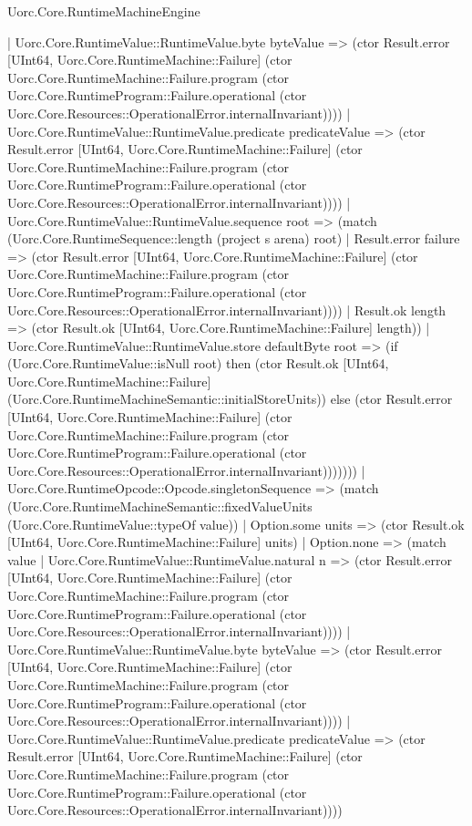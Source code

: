 \begin{lexlean}{Uorc.Core.RuntimeMachineEngine}
\begin{semanticmodule}
{              | Uorc.Core.RuntimeValue::RuntimeValue.byte byteValue => (ctor Result.error [UInt64, Uorc.Core.RuntimeMachine::Failure] (ctor Uorc.Core.RuntimeMachine::Failure.program (ctor Uorc.Core.RuntimeProgram::Failure.operational (ctor Uorc.Core.Resources::OperationalError.internalInvariant))))
              | Uorc.Core.RuntimeValue::RuntimeValue.predicate predicateValue => (ctor Result.error [UInt64, Uorc.Core.RuntimeMachine::Failure] (ctor Uorc.Core.RuntimeMachine::Failure.program (ctor Uorc.Core.RuntimeProgram::Failure.operational (ctor Uorc.Core.Resources::OperationalError.internalInvariant))))
              | Uorc.Core.RuntimeValue::RuntimeValue.sequence root => (match (Uorc.Core.RuntimeSequence::length (project s arena) root)
                | Result.error failure => (ctor Result.error [UInt64, Uorc.Core.RuntimeMachine::Failure] (ctor Uorc.Core.RuntimeMachine::Failure.program (ctor Uorc.Core.RuntimeProgram::Failure.operational (ctor Uorc.Core.Resources::OperationalError.internalInvariant))))
                | Result.ok length => (ctor Result.ok [UInt64, Uorc.Core.RuntimeMachine::Failure] length))
              | Uorc.Core.RuntimeValue::RuntimeValue.store defaultByte root => (if (Uorc.Core.RuntimeValue::isNull root) then (ctor Result.ok [UInt64, Uorc.Core.RuntimeMachine::Failure] (Uorc.Core.RuntimeMachineSemantic::initialStoreUnits)) else (ctor Result.error [UInt64, Uorc.Core.RuntimeMachine::Failure] (ctor Uorc.Core.RuntimeMachine::Failure.program (ctor Uorc.Core.RuntimeProgram::Failure.operational (ctor Uorc.Core.Resources::OperationalError.internalInvariant)))))))
          | Uorc.Core.RuntimeOpcode::Opcode.singletonSequence => (match (Uorc.Core.RuntimeMachineSemantic::fixedValueUnits (Uorc.Core.RuntimeValue::typeOf value))
            | Option.some units => (ctor Result.ok [UInt64, Uorc.Core.RuntimeMachine::Failure] units)
            | Option.none => (match value
              | Uorc.Core.RuntimeValue::RuntimeValue.natural n => (ctor Result.error [UInt64, Uorc.Core.RuntimeMachine::Failure] (ctor Uorc.Core.RuntimeMachine::Failure.program (ctor Uorc.Core.RuntimeProgram::Failure.operational (ctor Uorc.Core.Resources::OperationalError.internalInvariant))))
              | Uorc.Core.RuntimeValue::RuntimeValue.byte byteValue => (ctor Result.error [UInt64, Uorc.Core.RuntimeMachine::Failure] (ctor Uorc.Core.RuntimeMachine::Failure.program (ctor Uorc.Core.RuntimeProgram::Failure.operational (ctor Uorc.Core.Resources::OperationalError.internalInvariant))))
              | Uorc.Core.RuntimeValue::RuntimeValue.predicate predicateValue => (ctor Result.error [UInt64, Uorc.Core.RuntimeMachine::Failure] (ctor Uorc.Core.RuntimeMachine::Failure.program (ctor Uorc.Core.RuntimeProgram::Failure.operational (ctor Uorc.Core.Resources::OperationalError.internalInvariant))))
}
\end{semanticmodule}
\end{lexlean}
